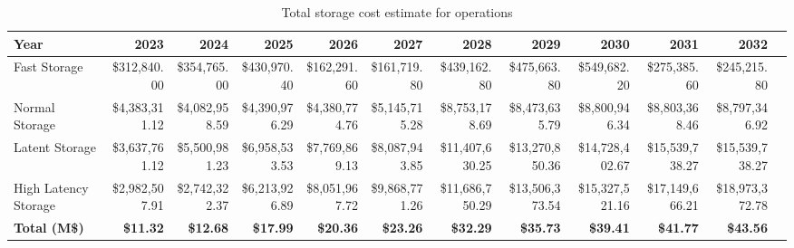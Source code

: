 \tiny \begin{longtable} { |p{}  |r  |r  |r  |r  |r  |r  |r  |r  |r  |r  |r |} 
\caption{Total storage cost estimate for operations \label{tab:opsStorageCost}}\\ 
\hline 
\textbf{Year}&\textbf{2023}&\textbf{2024}&\textbf{2025}&\textbf{2026}&\textbf{2027}&\textbf{2028}&\textbf{2029}&\textbf{2030}&\textbf{2031}&\textbf{2032} \\ \hline
{Fast Storage}&{\$312,840.00}&{\$354,765.00}&{\$430,970.40}&{\$162,291.60}&{\$161,719.80}&{\$439,162.80}&{\$475,663.80}&{\$549,682.20}&{\$275,385.60}&{\$245,215.80} \\ \hline
{Normal Storage}&{\$4,383,311.12}&{\$4,082,958.59}&{\$4,390,976.29}&{\$4,380,774.76}&{\$5,145,715.28}&{\$8,753,178.69}&{\$8,473,635.79}&{\$8,800,946.34}&{\$8,803,368.46}&{\$8,797,346.92} \\ \hline
{Latent Storage}&{\$3,637,761.12}&{\$5,500,981.23}&{\$6,958,533.53}&{\$7,769,869.13}&{\$8,087,943.85}&{\$11,407,630.25}&{\$13,270,850.36}&{\$14,728,402.67}&{\$15,539,738.27}&{\$15,539,738.27} \\ \hline
{High Latency Storage}&{\$2,982,507.91}&{\$2,742,322.37}&{\$6,213,926.89}&{\$8,051,967.72}&{\$9,868,771.26}&{\$11,686,750.29}&{\$13,506,373.54}&{\$15,327,521.16}&{\$17,149,666.21}&{\$18,973,372.78} \\ \hline
\textbf{Total (M\$)}&\textbf{\$11.32}&\textbf{\$12.68}&\textbf{\$17.99}&\textbf{\$20.36}&\textbf{\$23.26}&\textbf{\$32.29}&\textbf{\$35.73}&\textbf{\$39.41}&\textbf{\$41.77}&\textbf{\$43.56} \\ \hline
\end{longtable} \normalsize
